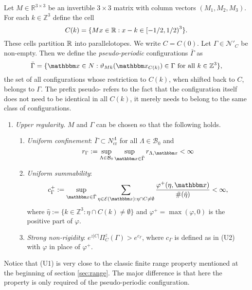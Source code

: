 Let $M\in\mathbb R^{3\times 3}$ be an invertible $3\times 3$ matrix with column vectors $(M_1,M_2,M_3)$. For each $k \in \mathbb Z^3$ define the cell
$$C(k) =  \{Mx \in \mathbb{R}: x-k \in \left[ -1/2, 1/2 \right)^3 \}.$$
These cells partition $\mathbb{R}$ into parallelotopes. We write $C=C(0)$. Let $\Gamma \in \mathcal N'_C$ be non-empty. Then we define the \textit{pseudo-periodic} configurations $\bar \Gamma$ as
$$\bar \Gamma = \{ \x \in N: \vartheta_{Mk}(\x_{C(k)}) \in \Gamma \text{ for all } k \in \mathbb Z^3 \},$$
the set of all configurations whose restriction to $C(k)$, when shifted back to $C$, belongs to $\Gamma$. The prefix pseudo- refers to the fact that the configuration itself does not need to be identical in all $C(k)$, it merely needs to belong to the same class of configurations.

\begin{enumerate}[\textbf{(U)}] 
	\item \textit{Upper regularity}. $M$ and $\Gamma$ can be chosen so that the following holds. 
		\begin{enumerate}[(U1)]
			\item \textit{Uniform confinement}: $\bar \Gamma \subset N^\Lambda_\text{cr}$ for all $\Lambda \in \mathcal B_0$ and 
			\begin{equation}\label{eq:U1}r_\Gamma := \sup_{\Lambda\in\mathcal B_0}\sup_{\x \in \bar\Gamma} r_{\Lambda, \x} < \infty\end{equation}
			\item \textit{Uniform summability}: 
			$$c^+_\Gamma := \sup_{\x \in \bar\Gamma}  \sum_{\eta \in \mathcal E(\x): \eta \cap C \neq \emptyset} \frac{\varphi^+(\eta,\x)}{\#(\hat\eta)} < \infty,$$
where $\hat\eta := \{k \in \mathbb Z^3: \eta \cap C(k) \neq \emptyset\}$ and $\varphi^+ = \max(\varphi,0)$ is the positive part of $\varphi$.
\item \textit{Strong non-rigidity}: $e^{z|C|} \Pi^z_C(\Gamma) > e^{c_\Gamma}$, where $c_\Gamma$ is defined as in (U2) with $\varphi$ in place of $\varphi^+$.
		\end{enumerate}
\end{enumerate}

Notice that (U1) is very close to the classic finite range property mentioned at the beginning of section \ref{sec:range}. The major difference is that here the property is only required of the pseudo-periodic configuration.


